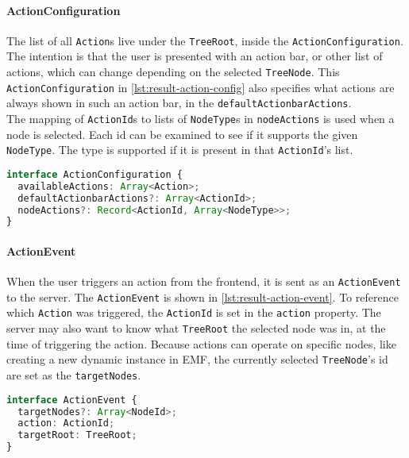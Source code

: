 \paragraph{ActionConfiguration}
The list of all \texttt{Action}s live under the \texttt{TreeRoot}, inside the \texttt{ActionConfiguration}.
The intention is that the user is presented with an action bar, or other list of actions, which can change depending on the selected \texttt{TreeNode}.
This \texttt{ActionConfiguration} in \cref{lst:result-action-config} also specifies what actions are always shown in such an action bar, in the \texttt{defaultActionbarActions}.\\

The mapping of \texttt{ActionId}s to lists of \texttt{NodeType}s in \texttt{nodeActions} is used when a node is selected.
Each id can be examined to see if it supports the given \texttt{NodeType}.
The type is supported if it is present in that \texttt{ActionId}'s list.


\begin{lstlisting}[language=Typescript, label={lst:result-action-config}, caption={[ActionConfiguration]ActionConfiguration TypeScript code.}]
interface ActionConfiguration {
  availableActions: Array<Action>;
  defaultActionbarActions?: Array<ActionId>;
  nodeActions?: Record<ActionId, Array<NodeType>>;
}
\end{lstlisting}


\paragraph{ActionEvent}
When the user triggers an action from the frontend, it is sent as an \texttt{ActionEvent} to the server.
The \texttt{ActionEvent} is shown in \cref{lst:result-action-event}.
To reference which \texttt{Action} was triggered, the \texttt{ActionId} is set in the \texttt{action} property.
The server may also want to know what \texttt{TreeRoot} the selected node was in, at the time of triggering the action.
Because actions can operate on specific nodes, like creating a new dynamic instance in \acrshort{EMF}, the currently selected \texttt{TreeNode}'s id are set as the \texttt{targetNodes}.

\begin{lstlisting}[language=Typescript, label={lst:result-action-event}, caption={[ActionEvent]ActionEvent TypeScript code.}]
interface ActionEvent {
  targetNodes?: Array<NodeId>;
  action: ActionId;
  targetRoot: TreeRoot;
}
\end{lstlisting}

